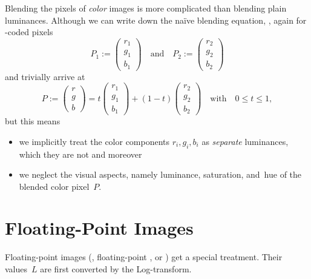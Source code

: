 Blending the pixels of \emph{color} images is more complicated than blending plain luminances.
Although we can write down the na\"ive blending equation, ,
again for -coded pixels
\[
  P_1 := \left(\begin{array}{c}r_1\\ g_1\\ b_1\end{array}\right)
  \quad \mbox{and}\quad
  P_2 := \left(\begin{array}{c}r_2\\ g_2\\ b_2\end{array}\right)
\]
and trivially arrive at
\begin{equation}\label{equ:trivial-rgb-blend}
  P :=
  \left(\begin{array}{c}r\\ g\\ b\end{array}\right) =
    t \left(\begin{array}{c}r_1\\ g_1\\ b_1\end{array}\right) +
    (1 - t) \left(\begin{array}{c}r_2\\ g_2\\ b_2\end{array}\right)
    \quad \mbox{with} \quad 0 \leq t \leq 1,
\end{equation}
but this means

\begin{itemize}
\item
  we implicitly treat the color components $r_i, g_i, b_i$ as \emph{separate} luminances, which
  they are not and moreover

\item
  we neglect the visual aspects, namely luminance, saturation, and~hue of the blended color
  pixel~$P$.
\end{itemize}


\section[Floating-Point Images]{\label{sec:floating-point-images}%
  Floating-Point Images}

Floating-point images
(, floating-point , or ) get a special treatment.  Their values~$L$ are first converted
by the Log-transform.


